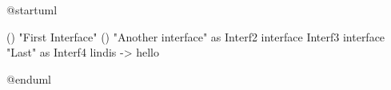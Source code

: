 @startuml

() "First Interface"
() "Another interface" as Interf2
interface Interf3
interface "Last\ninterface" as Interf4
lindis -> hello

@enduml
